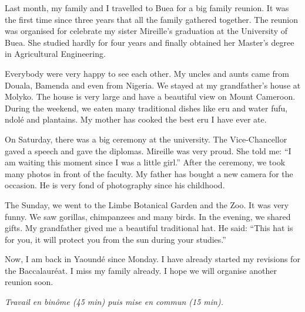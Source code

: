 \documentclass[11pt]{article}
\newcounter{popsec}
\newcounter{popsub}
\newcommand{\courssub}[1]{%
  \stepcounter{popsub}%
  \par\vspace{9pt}\noindent{\popxbold\fontsize{11.5}{13}\selectfont\color{popink}{\color{poporange}\thepopsec.\thepopsub}\hspace{6pt}#1}\par\nopagebreak\vspace{4pt}
}
\begin{document}
\begin{textebox}
Last month, my family and I travelled to Buea for a big family reunion. It was the first time since three years that all the family gathered together. The reunion was organised for celebrate my sister Mireille's graduation at the University of Buea. She studied hardly for four years and finally obtained her Master's degree in Agricultural Engineering.

Everybody were very happy to see each other. My uncles and aunts came from Douala, Bamenda and even from Nigeria. We stayed at my grandfather's house at Molyko. The house is very large and have a beautiful view on Mount Cameroon. During the weekend, we eaten many traditional dishes like eru and water fufu, ndolé and plantains. My mother has cooked the best eru I have ever ate.

On Saturday, there was a big ceremony at the university. The Vice-Chancellor gaved a speech and gave the diplomas. Mireille was very proud. She told me: “I am waiting this moment since I was a little girl.” After the ceremony, we took many photos in front of the faculty. My father has bought a new camera for the occasion. He is very fond of photography since his childhood.

The Sunday, we went to the Limbe Botanical Garden and the Zoo. It was very funny. We saw gorillas, chimpanzees and many birds. In the evening, we shared gifts. My grandfather gived me a beautiful traditional hat. He said: “This hat is for you, it will protect you from the sun during your studies.”

Now, I am back in Yaoundé since Monday. I have already started my revisions for the Baccalauréat. I miss my family already. I hope we will organise another reunion soon.
\end{textebox}

\courssub{Consignes}
\emph{Travail en binôme (45 min) puis mise en commun (15 min).}
\end{document}
